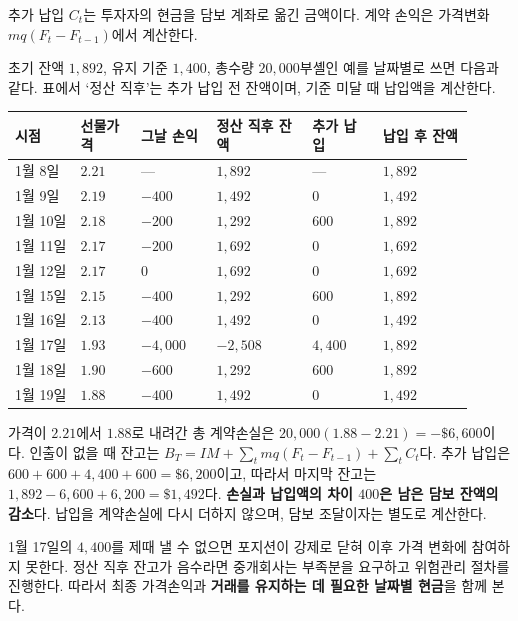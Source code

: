 \documentclass[11pt,a4paper]{article}
\begin{document}
추가 납입 $C_t$는 투자자의 현금을 담보 계좌로 옮긴 금액이다. 계약 손익은 가격변화 $mq(F_t-F_{t-1})$에서 계산한다.\par

초기 잔액 $1,892$, 유지 기준 $1,400$, 총수량 $20,000$부셸인 예를 날짜별로 쓰면 다음과 같다. 표에서 ‘정산 직후’는 추가 납입 전 잔액이며, 기준 미달 때 납입액을 계산한다.\par

\begin{center}\footnotesize\setlength{\tabcolsep}{3pt}\begin{tabular}{p{0.13\linewidth}p{0.12\linewidth}p{0.15\linewidth}p{0.19\linewidth}p{0.14\linewidth}p{0.18\linewidth}}\hline
시점 & 선물가격 & 그날 손익 & 정산 직후 잔액 & 추가 납입 & 납입 후 잔액 \\ \hline
1월 8일 & $2.21$ & — & $1,892$ & — & $1,892$ \\
1월 9일 & $2.19$ & $-400$ & $1,492$ & $0$ & $1,492$ \\
1월 10일 & $2.18$ & $-200$ & $1,292$ & $600$ & $1,892$ \\
1월 11일 & $2.17$ & $-200$ & $1,692$ & $0$ & $1,692$ \\
1월 12일 & $2.17$ & $0$ & $1,692$ & $0$ & $1,692$ \\
1월 15일 & $2.15$ & $-400$ & $1,292$ & $600$ & $1,892$ \\
1월 16일 & $2.13$ & $-400$ & $1,492$ & $0$ & $1,492$ \\
1월 17일 & $1.93$ & $-4,000$ & $-2,508$ & $4,400$ & $1,892$ \\
1월 18일 & $1.90$ & $-600$ & $1,292$ & $600$ & $1,892$ \\
1월 19일 & $1.88$ & $-400$ & $1,492$ & $0$ & $1,492$ \\
\hline\end{tabular}\end{center}\normalsize

가격이 $2.21$에서 $1.88$로 내려간 총 계약손실은 $20{,}000(1.88-2.21)=-\$6{,}600$이다. 인출이 없을 때 잔고는 $B_T=IM+\sum_t mq(F_t-F_{t-1})+\sum_t C_t$다. 추가 납입은 $600+600+4{,}400+600=\$6{,}200$이고, 따라서 마지막 잔고는 $1{,}892-6{,}600+6{,}200=\$1{,}492$다. \textbf{손실과 납입액의 차이 $400$은 남은 담보 잔액의 감소}다. 납입을 계약손실에 다시 더하지 않으며, 담보 조달이자는 별도로 계산한다.\par

1월 17일의 $4{,}400$를 제때 낼 수 없으면 포지션이 강제로 닫혀 이후 가격 변화에 참여하지 못한다. 정산 직후 잔고가 음수라면 중개회사는 부족분을 요구하고 위험관리 절차를 진행한다. 따라서 최종 가격손익과 \textbf{거래를 유지하는 데 필요한 날짜별 현금}을 함께 본다.\par
\end{document}
